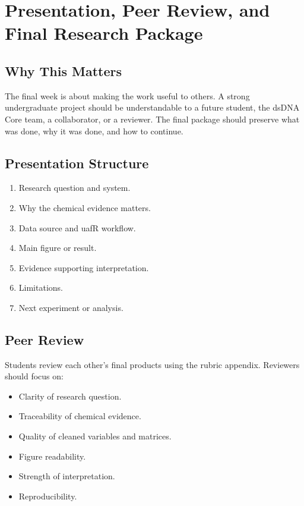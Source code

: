 \chapter{Presentation, Peer Review, and Final Research Package}


\section{Why This Matters}
The final week is about making the work useful to others. A strong undergraduate project should be understandable to a future student, the dsDNA Core team, a collaborator, or a reviewer. The final package should preserve what was done, why it was done, and how to continue.

\section{Presentation Structure}
\begin{enumerate}
  \item Research question and system.
  \item Why the chemical evidence matters.
  \item Data source and uafR workflow.
  \item Main figure or result.
  \item Evidence supporting interpretation.
  \item Limitations.
  \item Next experiment or analysis.
\end{enumerate}

\section{Peer Review}
Students review each other's final products using the rubric appendix. Reviewers should focus on:
\begin{itemize}
  \item Clarity of research question.
  \item Traceability of chemical evidence.
  \item Quality of cleaned variables and matrices.
  \item Figure readability.
  \item Strength of interpretation.
  \item Reproducibility.
\end{itemize}

